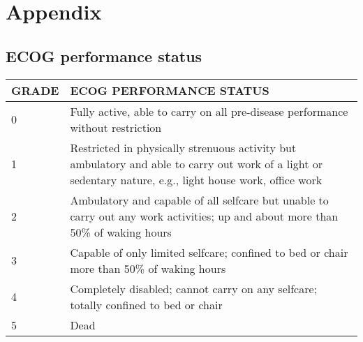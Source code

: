 
\section{Appendix}
\subsection{ECOG performance status}


\begin{tabular}{|l p{8cm}|}
\hline
GRADE&	ECOG PERFORMANCE STATUS\\
\hline\hline
0	&Fully active, able to carry on all pre-disease performance without restriction\\
1	&Restricted in physically strenuous activity but ambulatory and able to carry out work of a light or sedentary nature, e.g., light house work, office work\\
2	&Ambulatory and capable of all selfcare but unable to carry out any work activities; up and about more than 50\% of waking hours\\
3	&Capable of only limited selfcare; confined to bed or chair more than 50\% of waking hours\\
4	&Completely disabled; cannot carry on any selfcare; totally confined to bed or chair\\
5	&Dead\\
\hline
\end{tabular}
\label{tab:ecog}
